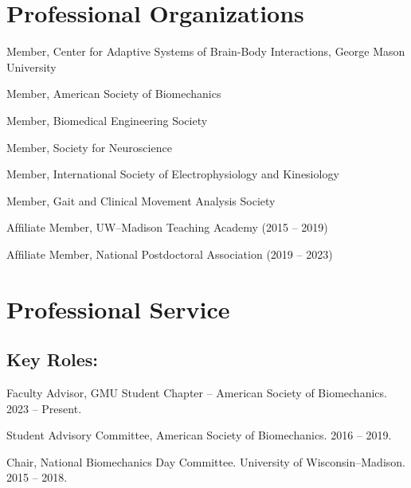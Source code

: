 \documentclass[letterpaper, 10pt]{article}
\begin{document}
\section{Professional Organizations}

\begin{compactitem} %
     \item Member, Center for Adaptive Systems of Brain-Body Interactions, George Mason University %
     \item Member, American Society of Biomechanics %
     \item Member, Biomedical Engineering Society %
     \item Member, Society for Neuroscience %
     \item Member, International Society of Electrophysiology and Kinesiology %
     \item Member, Gait and Clinical Movement Analysis Society %
     \item Afﬁliate Member, UW--Madison Teaching Academy (2015 -- 2019)
     \item Afﬁliate Member, National Postdoctoral Association (2019 -- 2023)
\end{compactitem} %

\section{Professional Service}

\subsection{Key Roles:}
\begin{compactitem}
    \item Faculty Advisor, GMU Student Chapter -- American Society of Biomechanics. 2023 -- Present.
    \item Student Advisory Committee, American Society of Biomechanics. 2016 -- 2019. %
    \item Chair, National Biomechanics Day Committee. University of Wisconsin--Madison. 2015 -- 2018.
\end{compactitem}
\end{document}
